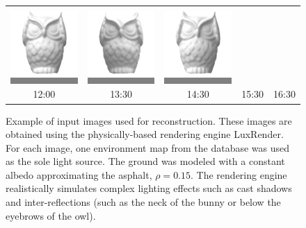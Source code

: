 \begin{figure}
\begin{tabular}{@{}c@{}c@{}c@{}c@{}c@{}}
\colorbox{Gray}{\includegraphics[height=2.8cm]{recons/owl-input-03.png}} &
\colorbox{Gray}{\includegraphics[height=2.8cm]{recons/owl-input-04.png}} &
\colorbox{Gray}{\includegraphics[height=2.8cm]{recons/owl-input-05.png}} \\
12:00 & 13:30 & 14:30 & 15:30 & 16:30
\end{tabular}
\vspace{.5em}
\caption[Example of input images used for reconstruction]{\small Example of input images used for reconstruction. These images are obtained using the physically-based rendering engine LuxRender. For each image, one environment map from the database was used as the sole light source. The ground was modeled with a constant albedo approximating the asphalt, $\rho = 0.15$. The rendering engine realistically simulates complex lighting effects such as cast shadows and inter-reflections (such as the neck of the bunny or below the eyebrows of the owl). }
\label{fig:luxrender-input}
\end{figure}


